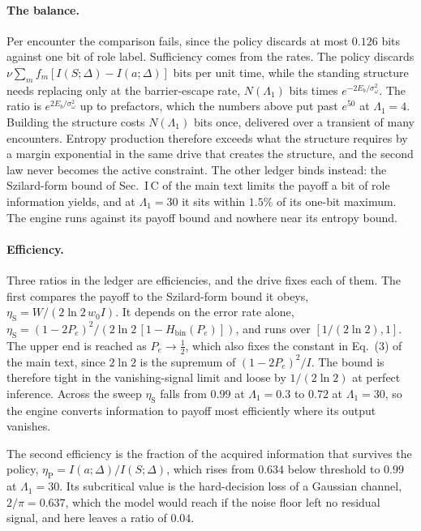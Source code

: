 \documentclass[
  aps,prx,
  preprint,
  superscriptaddress,
  nofootinbib
]{revtex4-2}
\newcommand{\sidn}{\sigma_{\omega}}
\begin{document}
\paragraph{The balance.} Per encounter the comparison fails, since the policy discards at most $0.126$ bits against one bit of role label. Sufficiency comes from the rates. The policy discards $\nu\sum_mf_m[I(S;\Delta)-I(a;\Delta)]$ bits per unit time, while the standing structure needs replacing only at the barrier-escape rate, $N(\Lambda_1)$ bits times $e^{-2E_b/\sidn^2}$. The ratio is $e^{2E_b/\sidn^2}$ up to prefactors, which the numbers above put past $e^{50}$ at $\Lambda_1=4$. Building the structure costs $N(\Lambda_1)$ bits once, delivered over a transient of many encounters. Entropy production therefore exceeds what the structure requires by a margin exponential in the same drive that creates the structure, and the second law never becomes the active constraint. The other ledger binds instead: the Szilard-form bound of Sec.~I\,C of the main text limits the payoff a bit of role information yields, and at $\Lambda_1=30$ it sits within $1.5\%$ of its one-bit maximum. The engine runs against its payoff bound and nowhere near its entropy bound.

\paragraph{Efficiency.} Three ratios in the ledger are efficiencies, and the drive fixes each of them. The first compares the payoff to the Szilard-form bound it obeys, $\eta_{\mathrm S}=W/(2\ln2\,w_0I)$. It depends on the error rate alone, $\eta_{\mathrm S}=(1-2P_e)^2/(2\ln2\,[1-H_{\mathrm{bin}}(P_e)])$, and runs over $[1/(2\ln2),1]$. The upper end is reached as $P_e\to\tfrac12$, which also fixes the constant in Eq.~(3) of the main text, since $2\ln2$ is the supremum of $(1-2P_e)^2/I$. The bound is therefore tight in the vanishing-signal limit and loose by $1/(2\ln2)$ at perfect inference. Across the sweep $\eta_{\mathrm S}$ falls from $0.99$ at $\Lambda_1=0.3$ to $0.72$ at $\Lambda_1=30$, so the engine converts information to payoff most efficiently where its output vanishes.

The second efficiency is the fraction of the acquired information that survives the policy, $\eta_{\mathrm P}=I(a;\Delta)/I(S;\Delta)$, which rises from $0.634$ below threshold to $0.99$ at $\Lambda_1=30$. Its subcritical value is the hard-decision loss of a Gaussian channel, $2/\pi=0.637$, which the model would reach if the noise floor left no residual signal, and here leaves a ratio of $0.04$.
\end{document}
